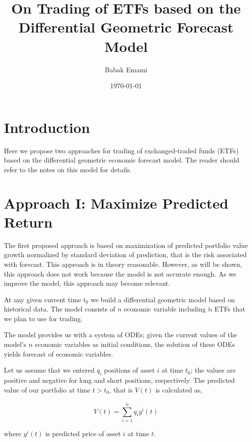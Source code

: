 \documentclass{article}
\title{On Trading of ETFs based on the Differential Geometric Forecast Model}
\author{Babak Emami}
\date{\today}
\begin{document}
\maketitle

\begin{abstract}


\end{abstract}

\section{Introduction}\label{section:introduction}

Here we propose two approaches for trading of exchanged-traded
funds (ETFs) based on the differential geometric economic forecast
model. The reader should refer to the notes on this model for details.

\section{Approach I: Maximize Predicted Return}\label{section:approach-1}

The first proposed approach is based on maximization of predicted
portfolio value growth normalized by standard deviation of prediction,
that is the risk associated with forecast. This approach is in theory
reasonable. However, as will be shown, this approach does not work
because the model is not accurate enough. As we improve the model,
this approach may become relevant.

At any given current time $t_{0}$ we build a differential geometric
model based on historical data. The model consists of $n$ economic
variable including $\tilde{n}$ ETFs that we plan to use for trading.

The model provides us with a system of ODEs; given the current values
of the model's $n$ economic variables as initial conditions, the
solution of these ODEs yields forecast of economic variables.

Let us assume that we entered $q_{i}$ positions of asset $i$ at time
$t_{0}$; the values are positive and negative for long and short
positions, respectively. The predicted value of our portfolio at time
$t > t_{0}$, that is $V(t)$ is calculated as,

\begin{equation}\label{eqn:prt-value}
V(t) = \sum_{i=1}^{\tilde{n}} q_{i} y^{i}(t)
\end{equation}

where $y^{i}(t)$ is predicted price of asset $i$ at time $t$. 
\end{document}
